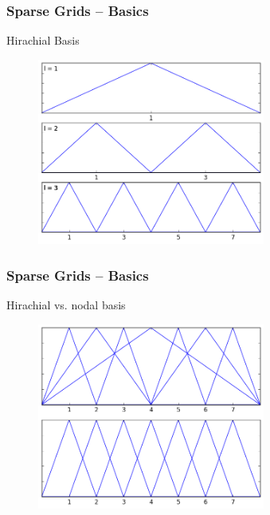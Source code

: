\begin{frame}
  \frametitle{Sparse Grids -- Basics}
  \topline
  \vspace{-10px}
  \begin{block}{Hirachial Basis}
    \begin{figure}[!htp]
      \centering
      \includegraphics[width=7.5cm]{images/sparse_hats}
      \vspace{-12px}
      \caption{}
    \end{figure}
  \end{block}
\end{frame}

\begin{frame}
  \frametitle{Sparse Grids -- Basics}
  \topline
  \vspace{-10px}
  \begin{block}{Hirachial vs. nodal  basis}
    \begin{figure}[!htp]
      \centering
      \includegraphics[width=7.5cm]{images/sparse_together}
      \vspace{-12px}
      \caption{}
    \end{figure}
  \end{block}
\end{frame}


